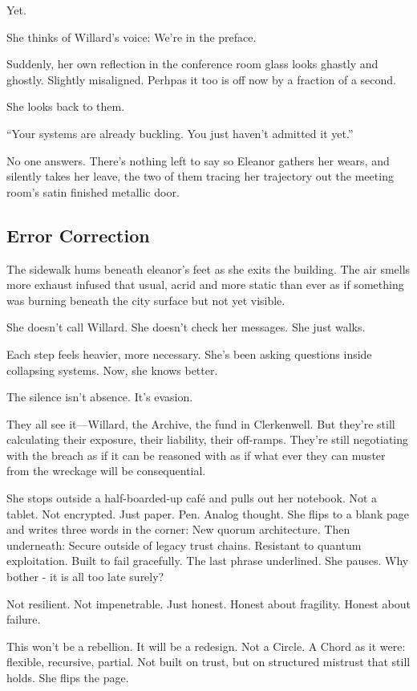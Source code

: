 Yet.

She thinks of Willard’s voice: We’re in the preface.

Suddenly, her own reflection in the conference room glass looks ghastly and ghostly. Slightly misaligned. Perhpas it too is off now by a fraction of a second.

She looks back to them.

“Your systems are already buckling. You just haven’t admitted it yet.”

No one answers.
There’s nothing left to say so Eleanor gathers her wears, and silently takes her leave, the two of them tracing her trajectory out the meeting room's satin finished metallic door.
\subsection*{Error Correction}
The sidewalk hums beneath eleanor's feet as she exits the building. The air smells more exhaust infused that usual, acrid and more static than ever as if something was burning beneath the city surface but not yet visible.

She doesn’t call Willard.
She doesn’t check her messages.
She just walks.

Each step feels heavier, more necessary.
She’s been asking questions inside collapsing systems.
Now, she knows better.

The silence isn’t absence. It’s evasion.

They all see it—Willard, the Archive, the fund in Clerkenwell. But they’re still calculating their exposure, their liability, their off-ramps. They’re still negotiating with the breach as if it can be reasoned with as if what ever they can muster from the wreckage will be consequential.

She stops outside a half-boarded-up café and pulls out her notebook. Not a tablet. Not encrypted. Just paper. Pen. Analog thought. She flips to a blank page and writes three words in the corner: New quorum architecture. Then underneath:
\smallskip
Secure outside of legacy trust chains.
Resistant to quantum exploitation.
Built to fail gracefully.
\smallskip
The last phrase underlined. She pauses. Why bother - it is all too late surely?

Not resilient. Not impenetrable. Just honest.
Honest about fragility. Honest about failure.

This won’t be a rebellion. It will be a redesign. Not a Circle. A Chord as it were: flexible, recursive, partial. Not built on trust, but on structured mistrust that still holds. She flips the page.

\newpage
